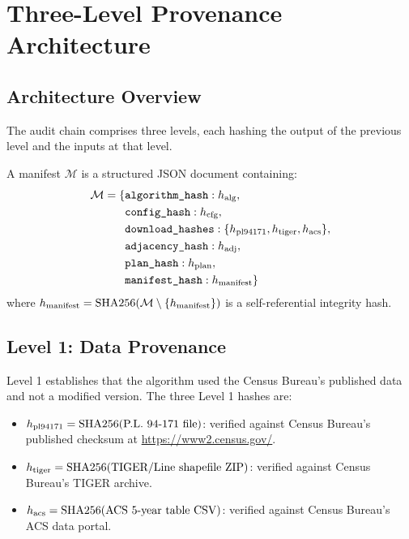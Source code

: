 \section{Three-Level Provenance Architecture}
\label{sec:provenance}

\subsection{Architecture Overview}

The \bisect{} audit chain comprises three levels, each hashing the output
of the previous level and the inputs at that level.

\begin{definition}
A \bisect{} manifest $\mathcal{M}$ is a structured JSON document containing:
\begin{align*}
\mathcal{M} = \{&
  \texttt{algorithm\_hash}: h_{\rm alg},\\
  &\texttt{config\_hash}: h_{\rm cfg},\\
  &\texttt{download\_hashes}: \{h_{\rm pl94171}, h_{\rm tiger}, h_{\rm acs}\},\\
  &\texttt{adjacency\_hash}: h_{\rm adj},\\
  &\texttt{plan\_hash}: h_{\rm plan},\\
  &\texttt{manifest\_hash}: h_{\rm manifest}
\}
\end{align*}
where $h_{\rm manifest} = \mathrm{SHA256}(\mathcal{M} \setminus \{h_{\rm manifest}\})$
is a self-referential integrity hash.
\end{definition}

\subsection{Level 1: Data Provenance}

Level 1 establishes that the algorithm used the Census Bureau's published
data and not a modified version.
The three Level 1 hashes are:
\begin{itemize}
\item $h_{\rm pl94171} = \mathrm{SHA256}(\text{P.L.\ 94-171 file})$:
  verified against Census Bureau's published checksum at
  \url{https://www2.census.gov/}.
\item $h_{\rm tiger} = \mathrm{SHA256}(\text{TIGER/Line shapefile ZIP})$:
  verified against Census Bureau's TIGER archive.
\item $h_{\rm acs} = \mathrm{SHA256}(\text{ACS 5-year table CSV})$:
  verified against Census Bureau's ACS data portal.
\end{itemize}

